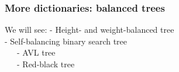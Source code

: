\documentclass[aspectratio=169]{beamer}
\begin{document}
\begin{frame}\frametitle{More dictionaries: balanced trees}

\begin{block}{We will see:}
  - Height- and weight-balanced tree
  \\- Self-balancing binary search tree
  \\~~~- AVL tree
  \\~~~- Red-black tree
\end{block}


\end{frame}
\end{document}
